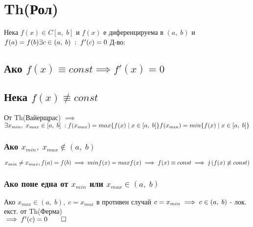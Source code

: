 \documentclass[12pt]{article}
\newcommand{\cntrdcn}{\lightning}
\begin{document}
\section*{Th(Рол)}
Нека \(f(x) \in C[a, \; b]\) и \(f(x)\) е диференцируема в \((a, \; b)\) и \(f(a) = f(b)\\
\exists c \in (a, \; b) \; : \; f'(c) = 0\)
\bigbreak
Д-во:

\subsection*{Ако \(f(x) \equiv const \implies f'(x) = 0\)}

\subsection*{Нека \(f(x) \not\equiv const\)}
От Th(Вайерщрас) \(\implies\)\\
\(\exists x_{min}, \; x_{max} \in [a, \; b] \; :\\
f(x_{max}) = max\{f(x) \; | \; x \in [a, \; b]\}\\
f(x_{min}) = min\{f(x) \; | \; x \in [a, \; b]\}\)

\subsubsection*{Ако \(x_{min}, \; x_{max} \notin (a, \; b)\)}
\(x_{min} \neq x_{max}, f(a) = f(b) \implies minf(x) = maxf(x)\\
\implies f(x) \equiv const \implies \cntrdcn (f(x) \not\equiv const)\)
\subsubsection*{Ако поне една от \(x_{min}\) или \(x_{max} \in (a, \; b)\)}

Ако \(x_{max} \in (a, \; b), \; c = x_{max}\) в противен случай \(c = x_{min}\\
\implies c \in (a, \; b)\) - лок. екст. от Th(Ферма)\\
\(\implies f'(c) = 0 \qed\)
\end{document}
